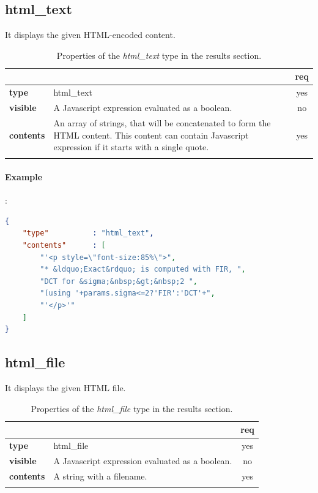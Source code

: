 \subsection{html\_text}

It displays the given HTML-encoded content.

\begin{longtable}{|>{\bf}L{\linewidth}|L{\linewidth}|c|}
\hline
{}     &  & {\bf req} \tabularnewline 
\hline \hline
 type      & html\_text  & yes \\ \hline
 visible    & A Javascript expression evaluated as a boolean. & no \\ \hline
 contents  & An array of strings, that will be concatenated to form the HTML 
             content. This content can contain Javascript expression if it starts
            with a single quote. & yes \\ \hline
\caption{Properties of the \emph{html\_text} type in the results section.}
\end{longtable}

\paragraph{Example}:\\
\begin{lstlisting}[language=json,firstnumber=1]
{ 
    "type"          : "html_text", 
    "contents"      : [
        "'<p style=\"font-size:85%\">",
        "* &ldquo;Exact&rdquo; is computed with FIR, ",
        "DCT for &sigma;&nbsp;&gt;&nbsp;2 ",
        "(using '+params.sigma<=2?'FIR':'DCT'+",
        "'</p>'" 
    ] 
}
\end{lstlisting}

\subsection{html\_file}

It displays the given HTML file.

\begin{longtable}{|>{\bf}L{\linewidth}|L{\linewidth}|c|}
\hline
{}     &  & {\bf req} \tabularnewline
\hline \hline
 type      & html\_file  & yes \\ \hline
 visible    & A Javascript expression evaluated as a boolean. & no \\ \hline
 contents  & A string with a filename. & yes \\ \hline
\caption{Properties of the \emph{html\_file} type in the results section.}
\end{longtable}

